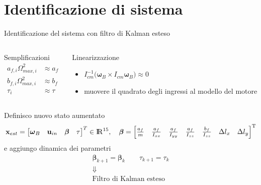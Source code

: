 \documentclass[]{beamer}
\begin{document}
	\section{Identificazione di sistema}
	
	\begin{frame}{Identificazione del sistema con filtro di Kalman esteso}
		\centering
		\begin{columns}
			\begin{column}{.4\textwidth}
				\centering
				\begin{block}{Semplificazioni}
					\setlength\abovedisplayskip{-10pt}
					\begin{align*}
						a_{f,i}\Omega_{max,i}^2 &\approx a_f \\
						b_{f,i}\Omega_{max,i}^2 &\approx b_f \\
						\tau_i &\approx \tau
					\end{align*}
				\end{block}
			\end{column}
			\begin{column}{.6\textwidth}
				\centering
				\begin{block}{Linearizzazione}
					\begin{itemize}
						\item $I_{cm}^{-1}\bigl(\boldsymbol{\omega}_B \times I_{cm} \boldsymbol{\omega}_B \bigl) \approx 0$
						\item muovere il quadrato degli ingressi al modello del motore
					\end{itemize}
				\end{block}
			\end{column}
		\end{columns}
		\centering
		Definisco nuovo stato aumentato
		\tiny
		\begin{equation*}
			\mathbf{x}_{est}=
			\begin{bmatrix}
				\boldsymbol{\omega}_B & \mathbf{u}_{in} & \boldsymbol{\beta} & \tau
			\end{bmatrix}^T
			\in \rm I\!R^{15}, \quad \boldsymbol{\beta}=
			\begin{bmatrix}
				\frac{a_f}{m} & \frac{a_f}{I_{xx}} & \frac{a_f}{I_{yy}} & \frac{a_f}{I_{zz}} & \frac{b_f}{I_{zz}} & \Delta l_x & \Delta l_y 
			\end{bmatrix}^T
		\end{equation*}
		\normalsize
		e aggiungo dinamica dei parametri
		\begin{gather*}
			\boldsymbol{\beta}_{k+1} = \boldsymbol{\beta}_k \qquad \tau_{k+1} = \tau_{k} \\
			\Downarrow \\
			\text{Filtro di Kalman esteso}
		\end{gather*}
	\end{frame}
	
\end{document}
